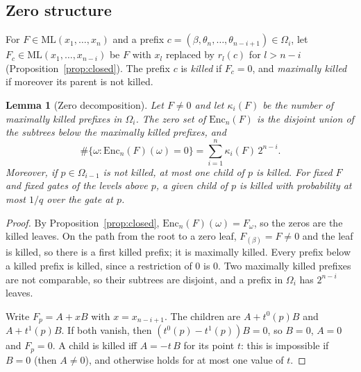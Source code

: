 \documentclass[11pt]{article}
\newtheorem{lemma}[theorem]{Lemma}
\theoremstyle{definition}
\newcommand{\ML}{\mathrm{ML}}
\newcommand{\Enc}{\mathrm{Enc}}
\begin{document}
\subsection{Zero structure}

For $F\in\ML(x_1,\dots,x_n)$ and a prefix $c=(\beta,\theta_n,\dots,\theta_{n-i+1})\in\Omega_i$, let
$F_c\in\ML(x_1,\dots,x_{n-i})$ be $F$ with $x_l$ replaced by $r_l(c)$ for $l>n-i$
(Proposition~\ref{prop:closed}). The prefix $c$ is \emph{killed} if $F_c=0$, and \emph{maximally
killed} if moreover its parent is not killed.

\begin{lemma}[Zero decomposition]\label{lem:zerodec}
Let $F\neq0$ and let $\kappa_i(F)$ be the number of maximally killed prefixes in $\Omega_i$. The
zero set of $\Enc_n(F)$ is the disjoint union of the subtrees below the maximally killed prefixes,
and
\[
\#\{\omega:\Enc_n(F)(\omega)=0\}=\sum_{i=1}^{n}\kappa_i(F)\,2^{n-i}.
\]
Moreover, if $p\in\Omega_{i-1}$ is not killed, at most one child of $p$ is killed. For fixed $F$
and fixed gates of the levels above $p$, a given child of $p$ is killed with probability at most
$1/q$ over the gate at $p$.
\end{lemma}
\begin{proof}
By Proposition~\ref{prop:closed}, $\Enc_n(F)(\omega)=F_\omega$, so the zeros are the killed leaves.
On the path from the root to a zero leaf, $F_{(\beta)}=F\neq0$ and the leaf is killed, so there is a
first killed prefix; it is maximally killed. Every prefix below a killed prefix is killed, since a
restriction of $0$ is $0$. Two maximally killed prefixes are not comparable, so their subtrees are
disjoint, and a prefix in $\Omega_i$ has $2^{n-i}$ leaves.

Write $F_p=A+xB$ with $x=x_{n-i+1}$. The children are $A+t^0(p)B$ and $A+t^1(p)B$. If both vanish,
then $(t^0(p)-t^1(p))B=0$, so $B=0$, $A=0$ and $F_p=0$. A child is killed iff $A=-t\,B$ for its point
$t$: this is impossible if $B=0$ (then $A\neq0$), and otherwise holds for at most one value of $t$.
\end{proof}
\end{document}

